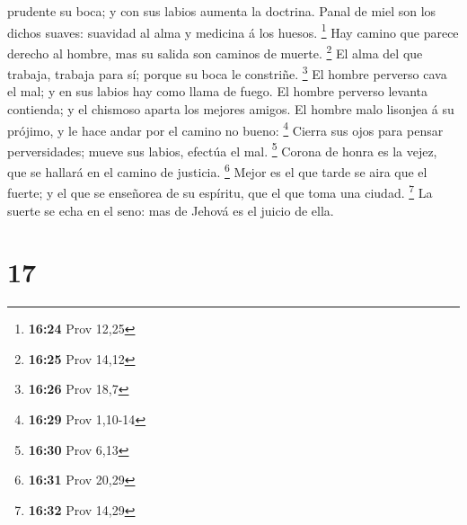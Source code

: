 prudente su boca; y con sus labios aumenta la doctrina. 
Panal de miel son los dichos suaves: suavidad al alma y medicina á los
huesos. \footnote{\textbf{16:24} Prov 12,25}  Hay camino
que parece derecho al hombre, mas su salida son caminos de muerte.
\footnote{\textbf{16:25} Prov 14,12}  El alma del que
trabaja, trabaja para sí; porque su boca le constriñe. \footnote{\textbf{16:26}
  Prov 18,7}  El hombre perverso cava el mal; y en sus
labios hay como llama de fuego.  El hombre perverso
levanta contienda; y el chismoso aparta los mejores amigos.
 El hombre malo lisonjea á su prójimo, y le hace andar
por el camino no bueno: \footnote{\textbf{16:29} Prov 1,10-14}
 Cierra sus ojos para pensar perversidades; mueve sus
labios, efectúa el mal. \footnote{\textbf{16:30} Prov 6,13}
 Corona de honra es la vejez, que se hallará en el camino
de justicia. \footnote{\textbf{16:31} Prov 20,29}  Mejor
es el que tarde se aira que el fuerte; y el que se enseñorea de su
espíritu, que el que toma una ciudad. \footnote{\textbf{16:32} Prov
  14,29}  La suerte se echa en el seno: mas de Jehová es
el juicio de ella.

\hypertarget{section-16}{%
\section{17}\label{section-16}}

